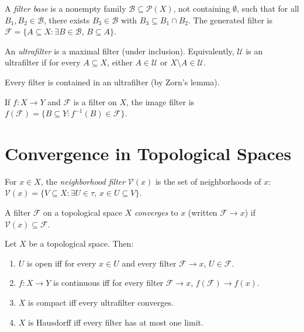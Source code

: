 \begin{definition}
A \emph{filter base} is a nonempty family $\mathcal{B} \subseteq \mathcal{P}(X)$, not
containing $\emptyset$, such that for all $B_1, B_2 \in \mathcal{B}$, there exists
$B_3 \in \mathcal{B}$ with $B_3 \subseteq B_1 \cap B_2$. The generated filter is
$\mathcal{F} = \{A \subseteq X : \exists B \in \mathcal{B},\, B \subseteq A\}$.
\end{definition}

\begin{definition}[Ultrafilter]
An \emph{ultrafilter} is a maximal filter (under inclusion). Equivalently, $\mathcal{U}$
is an ultrafilter if for every $A \subseteq X$, either $A \in \mathcal{U}$ or
$X \setminus A \in \mathcal{U}$.
\end{definition}

\begin{theorem}
Every filter is contained in an ultrafilter (by Zorn's lemma).
\end{theorem}

\begin{definition}
If $f\colon X \to Y$ and $\mathcal{F}$ is a filter on $X$, the image filter is
$f(\mathcal{F}) = \{B \subseteq Y : f^{-1}(B) \in \mathcal{F}\}$.
\end{definition}

\section{Convergence in Topological Spaces}

\begin{definition}
For $x \in X$, the \emph{neighborhood filter} $\mathcal{V}(x)$ is the set of neighborhoods
of $x$: $\mathcal{V}(x) = \{V \subseteq X : \exists U \in \tau,\, x \in U \subseteq V\}$.
\end{definition}

\begin{definition}
A filter $\mathcal{F}$ on a topological space $X$ \emph{converges} to $x$ (written
$\mathcal{F} \to x$) if $\mathcal{V}(x) \subseteq \mathcal{F}$.
\end{definition}

\begin{theorem}
Let $X$ be a topological space. Then:
\begin{enumerate}
  \item $U$ is open iff for every $x \in U$ and every filter $\mathcal{F} \to x$,
    $U \in \mathcal{F}$.
  \item $f\colon X \to Y$ is continuous iff for every filter $\mathcal{F} \to x$,
    $f(\mathcal{F}) \to f(x)$.
  \item $X$ is compact iff every ultrafilter converges.
  \item $X$ is Hausdorff iff every filter has at most one limit.
\end{enumerate}
\end{theorem}

